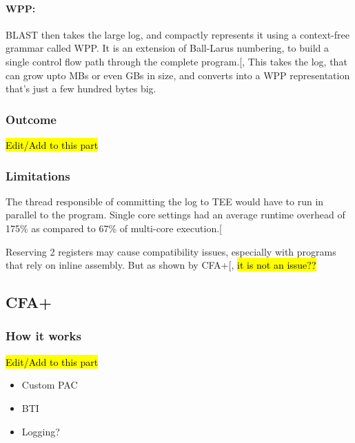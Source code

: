 \documentclass[a4paper, nobind]{templates/ociamthesis}
\providecommand{\tightlist}{%
  \setlength{\itemsep}{0pt}\setlength{\parskip}{0pt}}
\begin{document}
\paragraph{WPP:}\label{wpp}

BLAST then takes the large log, and compactly represents it using a context-free
grammar called WPP. It is an extension of Ball-Larus numbering, to build a single
control flow path through the complete program.{[}, \citeproc{ref-blast}{14}{]}
This takes the log, that can grow upto MBs or even GBs in size, and converts into
a WPP representation that's just a few hundred bytes big.

\subsubsection{Outcome}\label{outcome}

\hl{Edit/Add to this part}

\subsubsection{Limitations}\label{limitations}

The thread responsible of committing the log to TEE would have to run in parallel
to the program. Single core settings had an average runtime overhead of 175\%
as compared to 67\% of multi-core execution.{[}\citeproc{ref-blast}{14}{]}

Reserving 2 registers may cause compatibility issues, especially with programs
that rely on inline assembly. But as shown by CFA+{[}\citeproc{ref-cfaplus}{1}{]},
\hl{it is not an issue??}

\subsection{CFA+}\label{cfa-1}

\subsubsection{How it works}\label{how-it-works-1}

\hl{Edit/Add to this part}

\begin{itemize}
\tightlist
\item
  Custom PAC
\item
  BTI
\item
  Logging?
\end{itemize}
\end{document}
